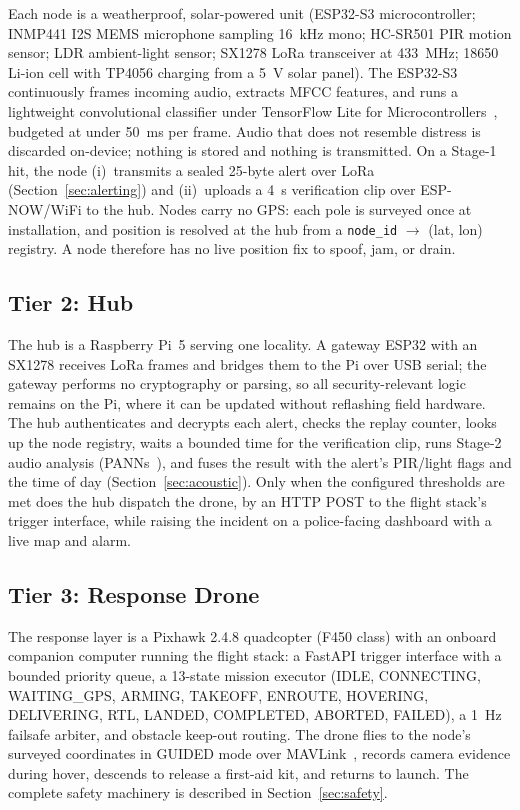 \documentclass[journal]{IEEEtran}
\begin{document}
Each node is a weatherproof, solar-powered unit (ESP32-S3 microcontroller;
INMP441 I2S MEMS microphone sampling 16~kHz mono; HC-SR501 PIR motion
sensor; LDR ambient-light sensor; SX1278 LoRa transceiver at 433~MHz; 18650
Li-ion cell with TP4056 charging from a 5~V solar panel). The ESP32-S3
continuously frames incoming audio, extracts MFCC features, and runs a
lightweight convolutional classifier under TensorFlow Lite for
Microcontrollers~\cite{david2021}, budgeted at under 50~ms per frame. Audio
that does not resemble distress is discarded on-device; nothing is stored
and nothing is transmitted. On a Stage-1 hit, the node (i)~transmits a
sealed 25-byte alert over LoRa (Section~\ref{sec:alerting}) and (ii)~uploads
a 4~s verification clip over ESP-NOW/WiFi to the hub. Nodes carry no GPS:
each pole is surveyed once at installation, and position is resolved at the
hub from a \texttt{node\_id} $\rightarrow$ (lat, lon) registry. A node
therefore has no live position fix to spoof, jam, or drain.

\subsection{Tier 2: Hub}

The hub is a Raspberry Pi~5 serving one locality. A gateway ESP32 with an
SX1278 receives LoRa frames and bridges them to the Pi over USB serial; the
gateway performs no cryptography or parsing, so all security-relevant logic
remains on the Pi, where it can be updated without reflashing field
hardware. The hub authenticates and decrypts each alert, checks the replay
counter, looks up the node registry, waits a bounded time for the
verification clip, runs Stage-2 audio analysis (PANNs~\cite{kong2020}), and
fuses the result with the alert's PIR/light flags and the time of day
(Section~\ref{sec:acoustic}). Only when the configured thresholds are met
does the hub dispatch the drone, by an HTTP POST to the flight stack's
trigger interface, while raising the incident on a police-facing dashboard
with a live map and alarm.

\subsection{Tier 3: Response Drone}

The response layer is a Pixhawk 2.4.8 quadcopter (F450 class) with an
onboard companion computer running the flight stack: a FastAPI trigger
interface with a bounded priority queue, a 13-state mission executor (IDLE,
CONNECTING, WAITING\_GPS, ARMING, TAKEOFF, ENROUTE, HOVERING, DELIVERING,
RTL, LANDED, COMPLETED, ABORTED, FAILED), a 1~Hz failsafe arbiter, and
obstacle keep-out routing. The drone flies to the node's surveyed
coordinates in GUIDED mode over MAVLink~\cite{ardupilot}, records camera
evidence during hover, descends to release a first-aid kit, and returns to
launch. The complete safety machinery is described in
Section~\ref{sec:safety}.
\end{document}

